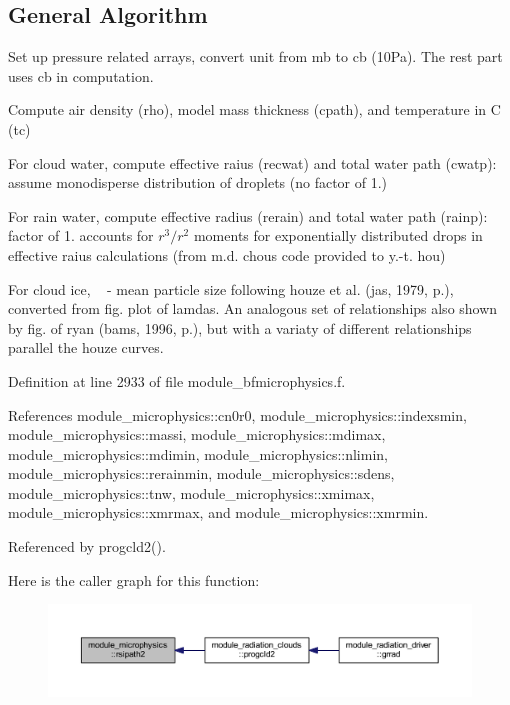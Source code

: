 \hypertarget{group__module__radsw__main_general}{}\subsection{General Algorithm}\label{group__module__radsw__main_general}

\begin{DoxyEnumerate}
\item Set up pressure related arrays, convert unit from mb to cb (10\+Pa). The rest part uses cb in computation.
\item Compute air density (rho), model mass thickness (cpath), and temperature in C (tc)
\item For cloud water, compute effective raius (recwat) and total water path (cwatp)\+: assume monodisperse distribution of droplets (no factor of 1.)
\item For rain water, compute effective radius (rerain) and total water path (rainp)\+: factor of 1. accounts for $ r^3/r^2 $ moments for exponentially distributed drops in effective raius calculations (from m.\+d. chou\textquotesingle{}s code provided to y.-\/t. hou)
\item For cloud ice, ~\newline
 -\/ mean particle size following houze et al. (jas, 1979, p.), converted from fig. plot of lamdas. An analogous set of relationships also shown by fig. of ryan (bams, 1996, p.), but with a variaty of different relationships parallel the houze curves. 
\end{DoxyEnumerate}

Definition at line 2933 of file module\+\_\+bfmicrophysics.\+f.



References module\+\_\+microphysics\+::cn0r0, module\+\_\+microphysics\+::indexsmin, module\+\_\+microphysics\+::massi, module\+\_\+microphysics\+::mdimax, module\+\_\+microphysics\+::mdimin, module\+\_\+microphysics\+::nlimin, module\+\_\+microphysics\+::rerainmin, module\+\_\+microphysics\+::sdens, module\+\_\+microphysics\+::tnw, module\+\_\+microphysics\+::xmimax, module\+\_\+microphysics\+::xmrmax, and module\+\_\+microphysics\+::xmrmin.



Referenced by progcld2().



Here is the caller graph for this function\+:
\nopagebreak
\begin{figure}[H]
\begin{center}
\leavevmode
\includegraphics[width=350pt]{group__module__radiation__clouds_ga3645dec44f2cc7e30b57d32531f74ba4_icgraph}
\end{center}
\end{figure}




